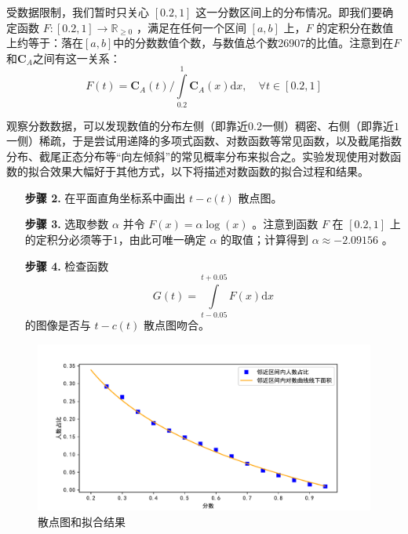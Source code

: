         受数据限制，我们暂时只关心 $[0.2,1]$ 这一分数区间上的分布情况。即我们要确定函数 $F:\left[0.2,1\right]\to\mathbb{R}_{\geq 0}$ ，满足在任何一个区间 $\left[a,b\right]$ 上，$F$ 的定积分在数值上约等于：落在$\left[a,b\right]$中的分数数值个数，与数值总个数26907的比值。注意到在$F$和$\bm{C}_A$之间有这一关系：$$F(t)=\bm{C}_A(t)\big/{\displaystyle\int\limits_{0.2}^1 \bm{C}_A(x)\mathrm{d}x},\quad\forall t\in[0.2,1]$$

        \vspace{1.5ex}

        观察分数数据，可以发现数值的分布左侧（即靠近$0.2$一侧）稠密、右侧（即靠近$1$一侧）稀疏，于是尝试用递降的多项式函数、对数函数等常见函数，以及截尾指数分布、截尾正态分布等“向左倾斜”的常见概率分布来拟合之。实验发现使用对数函数的拟合效果大幅好于其他方式，以下将描述对数函数的拟合过程和结果。

        \begin{enumerate}[leftmargin=6em]
            \item [\textbf{步骤 2.}] 在平面直角坐标系中画出 $t-c(t)$ 散点图。
            \item [\textbf{步骤 3.}] 选取参数 $\alpha$ 并令 $F(x)=\alpha\log(x)$ 。注意到函数 $F$ 在 $[0.2,1]$ 上的定积分必须等于$1$，由此可唯一确定 $\alpha$ 的取值；计算得到 $\alpha\approx-2.09156$ 。
            \item [\textbf{步骤 4.}] 检查函数 $$G(t)=\int\limits_{t-0.05}^{t+0.05}F(x)\mathrm{d}x$$ 的图像是否与 $t-c(t)$ 散点图吻合。
        \end{enumerate}

        \begin{figure}
            \centering
            \includegraphics[width=\textwidth]{fig/fittingNoipScores.pdf}
            \caption{散点图和拟合结果}
            \label{fig:fittingNoipScoresByLogCurve}
        \end{figure}

